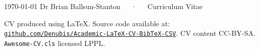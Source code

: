 \documentclass[11pt, a4paper]{awesome-cv}
\begin{document}
\makecvheader[C]

\makecvfooter
  {\today}
  {Dr Brian Ballsun-Stanton~~~·~~~Curriculum Vitae}
  {\thepage}


\vspace{0.5cm}









% 

% 

% 
% 
% 
% 
% 




\vfill
{\tiny
CV produced using \LaTeX. Source code available at: \href{https://github.com/Denubis/Academic-LaTeX-CV-BibTeX-CSV}{\tt github.com/Denubis/Academic-LaTeX-CV-BibTeX-CSV}. CV content CC-BY-SA. {\tt Awesome-CV.cls} licensed LPPL.}

\end{document}
